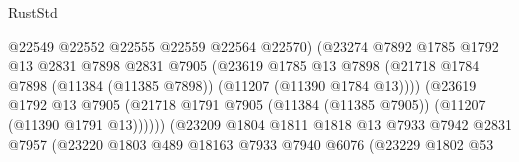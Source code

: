\begin{lexlean}{RustStd}
\begin{coremodule}
                                          @22549
                                          @22552
                                          @22555
                                          @22559
                                          @22564
                                          @22570)
                                        (@23274
                                          @7892
                                          @1785
                                          @1792
                                          @13
                                          @2831
                                          @7898
                                          @2831
                                          @7905
                                          (@23619
                                            @1785
                                            @13
                                            @7898
                                            (@21718
                                              @1784
                                              @7898
                                              (@11384 (@11385 @7898))
                                              (@11207 (@11390 @1784 @13))))
                                          (@23619
                                            @1792
                                            @13
                                            @7905
                                            (@21718
                                              @1791
                                              @7905
                                              (@11384 (@11385 @7905))
                                              (@11207 (@11390 @1791 @13))))))
                                      (@23209
                                        @1804
                                        @1811
                                        @1818
                                        @13
                                        @7933
                                        @7942
                                        @2831
                                        @7957
                                        (@23220
                                          @1803
                                          @489
                                          @18163
                                          @7933
                                          @7940
                                          @6076
                                          (@23229
                                            @1802
                                            @53

\end{coremodule}
\end{lexlean}
